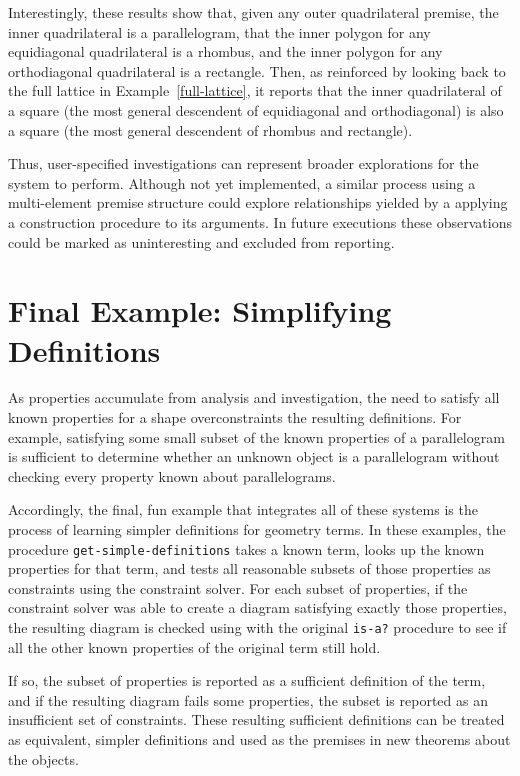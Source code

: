Interestingly, these results show that, given any outer quadrilateral
premise, the inner quadrilateral is a parallelogram, that the inner
polygon for any equidiagonal quadrilateral is a rhombus, and the inner
polygon for any orthodiagonal quadrilateral is a rectangle. Then, as
reinforced by looking back to the full lattice in
Example~\ref{full-lattice}, it reports that the inner quadrilateral of
a square (the most general descendent of equidiagonal and
orthodiagonal) is also a square (the most general descendent of
rhombus and rectangle).


Thus, user-specified investigations can represent broader explorations
for the system to perform.  Although not yet implemented, a similar
process using a multi-element premise structure could explore
relationships yielded by a applying a construction procedure to its
arguments. In future executions these observations could be marked as
uninteresting and excluded from reporting.

\section{Final Example: Simplifying Definitions}
\label{sec:end-goal-2}

As properties accumulate from analysis and investigation, the need to
satisfy all known properties for a shape overconstraints the resulting
definitions. For example, satisfying some small subset of the known
properties of a parallelogram is sufficient to determine whether an
unknown object is a parallelogram without checking every property
known about parallelograms.

Accordingly, the final, fun example that integrates all of these
systems is the process of learning simpler definitions for geometry
terms. In these examples, the procedure
\texttt{get-simple-definitions} takes a known term, looks up the known
properties for that term, and tests all reasonable subsets of those
properties as constraints using the constraint solver. For each subset
of properties, if the constraint solver was able to create a diagram
satisfying exactly those properties, the resulting diagram is checked
using with the original \texttt{is-a?} procedure to see if all the
other known properties of the original term still hold.

If so, the subset of properties is reported as a sufficient definition
of the term, and if the resulting diagram fails some properties, the
subset is reported as an insufficient set of constraints. These
resulting sufficient definitions can be treated as equivalent, simpler
definitions and used as the premises in new theorems about the
objects.

